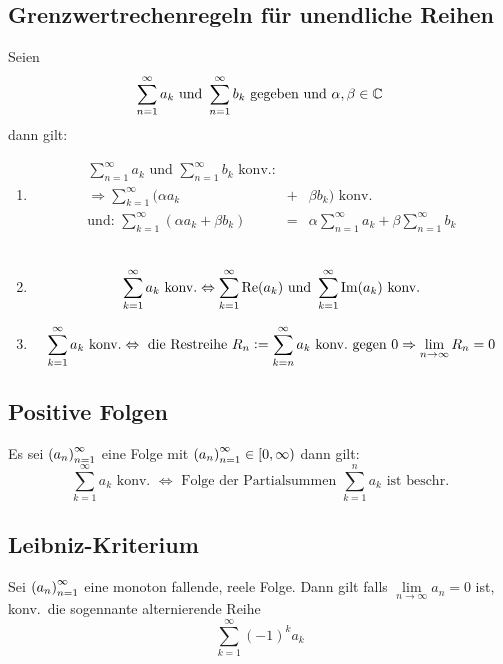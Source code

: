 \subsection{Grenzwertrechenregeln für unendliche Reihen}
Seien
\begin{equation*}
    \sum_{n=1}^\infty a_k \text{ und } \sum_{n=1}^\infty b_k
    \text{ gegeben und } \alpha,\beta \in \mathbb{C}
\end{equation*}
dann gilt:
\begin{enumerate}[label= (\alph*)]
    \item
        \begin{eqnarray*}
            \sum_{n=1}^\infty a_k \text{ und } \sum_{n=1}^\infty b_k \text{ konv.:}\\
            \Rightarrow \sum_{k=1}^\infty(\alpha a_k &+& \beta b_k) \text{ konv.}\\
            \text{und: }
            \sum_{k=1}^\infty(\alpha a_k + \beta b_k) &=& \alpha \sum_{n=1}^\infty a_k
            + \beta \sum_{n=1}^\infty b_k
        \end{eqnarray*}\\
    \item
        \begin{equation*}
            \sum_{k=1}^\infty a_k \text{ konv.} \Leftrightarrow
            \sum_{k=1}^\infty \operatorname{Re}(a_k) \text{ und }
            \sum_{k=1}^\infty \operatorname{Im}(a_k) \text{ konv.}
        \end{equation*}
    \item
        \begin{equation*}
            \sum_{k=1}^\infty a_k \text{ konv.} \Leftrightarrow
            \text{ die Restreihe } R_n := \sum_{k=n}^\infty a_k \text{ konv.\ gegen }0\\
            \Rightarrow \lim_{n \rightarrow \infty} R_n = 0
        \end{equation*}
\end{enumerate}

\subsection{Positive Folgen}
Es sei ${(a_n)}_{n=1}^\infty$ eine Folge mit ${(a_n)}_{n=1}^\infty \in \left[0, \infty\right)$ dann gilt:
\begin{equation*}
    \sum_{k=1}^\infty a_k \text{ konv. } \Leftrightarrow
    \text{ Folge der Partialsummen }\sum_{k=1}^n a_k \text{ ist beschr.}
\end{equation*}

\subsection{Leibniz-Kriterium}
Sei ${(a_n)}_{n=1}^\infty$ eine monoton fallende, reele Folge. Dann gilt falls
$\lim\limits_{n \rightarrow \infty} a_n = 0$ ist, konv.\ die sogennante
alternierende Reihe
\begin{equation*}
    \sum_{k=1}^\infty {(-1)}^k a_k
\end{equation*}



